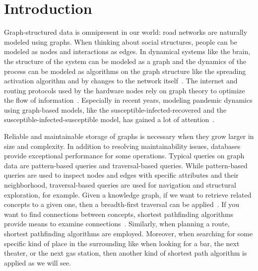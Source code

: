 \chapter{Introduction}\label{\positionnumber}
Graph-structured data is omnipresent in our world:
road networks are naturally modeled using graphs.
When thinking about social structures, people can be modeled as nodes and interactions as edges. 
In dynamical systems like the brain, the structure of the system can be modeled as a graph and the dynamics of the process can be modeled as algorithms on the graph structure like the spreading activation algorithm and by changes to the network itself~\autocite{anderson, dayan1991reinforcing}.
The internet and routing protocols used by the hardware nodes rely on graph theory to optimize the flow of information~\autocite{bgp}.
Especially in recent years, modeling pandemic dynamics using graph-based models, like the susceptible-infected-recovered and the susceptible-infected-susceptible model, has gained a lot of attention~\autocite{kermack1927contribution, dawood2012estimated, sridhar2020modeling, chang2020modeling}.

Reliable and maintainable storage of graphs is necessary when they grow larger in size and complexity.
In addition to resolving maintainability issues, databases provide exceptional performance for some operations. 
Typical queries on graph data are pattern-based queries and traversal-based queries. 
While pattern-based queries are used to inspect nodes and edges with specific attributes and their neighborhood, traversal-based queries are used for navigation and structural exploration, for example.
Given a knowledge graph, if we want to retrieve related concepts to a given one, then a breadth-first traversal can be applied~\autocite{anderson}. 
If you want to find connections between concepts, shortest pathfinding algorithms provide means to examine connections~\autocite{minsky1982semantic}.
Similarly, when planning a route, shortest pathfinding algorithms are employed. 
Moreover, when searching for some specific kind of place in the surrounding like when looking for a bar, the next theater, or the next gas station, then another kind of shortest path algorithm is applied as we will see.~\autocite{bast2016route} 

